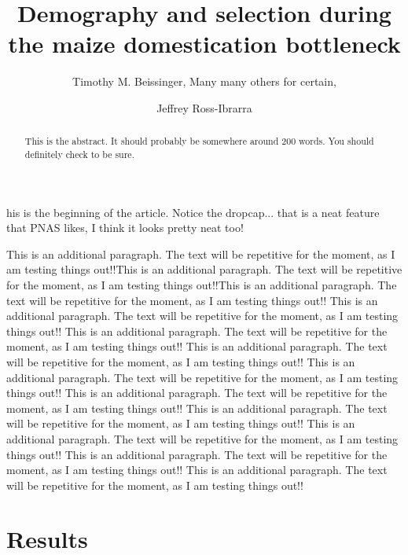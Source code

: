 \documentclass{pnastwo}
\begin{document}
\title{Demography and selection during the maize domestication
  bottleneck}
\author{Timothy M. Beissinger, Many many others for certain, \and Jeffrey Ross-Ibrarra }


\maketitle

\begin{article}

\begin{abstract}
This is the abstract. It should probably be somewhere around 200 words. You should definitely check to be sure.
\end{abstract}

his is the beginning of the article. Notice the
dropcap... that is a neat feature that PNAS likes, I think it looks
pretty neat too!

This is an additional paragraph. The text will be repetitive for the
moment, as I am testing things out!!This is an additional paragraph. The text will be repetitive for the
moment, as I am testing things out!!This is an additional paragraph. The text will be repetitive for the
moment, as I am testing things out!!
This is an additional paragraph. The text will be repetitive for the
moment, as I am testing things out!!
This is an additional paragraph. The text will be repetitive for the
moment, as I am testing things out!!
This is an additional paragraph. The text will be repetitive for the
moment, as I am testing things out!!
This is an additional paragraph. The text will be repetitive for the
moment, as I am testing things out!!
This is an additional paragraph. The text will be repetitive for the
moment, as I am testing things out!!
This is an additional paragraph. The text will be repetitive for the
moment, as I am testing things out!!
This is an additional paragraph. The text will be repetitive for the
moment, as I am testing things out!!
This is an additional paragraph. The text will be repetitive for the
moment, as I am testing things out!!
This is an additional paragraph. The text will be repetitive for the
moment, as I am testing things out!!

\section{Results}

\end{article}
\end{document}
